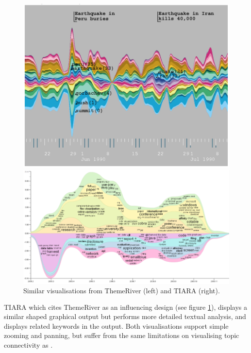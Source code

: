 \begin{figure}[h]
\centering
\begin{minipage}{.45\textwidth}
  \centering
  \hspace{-1cm}\includegraphics[width=.9\linewidth]{img/lit-survey/histogram1.png}
  \end{minipage}%
\begin{minipage}{.65\textwidth}
  \centering
  \hspace{-1.5cm}\includegraphics[width=.9\linewidth]{img/lit-survey/histogram2.png}
\end{minipage}
\caption{Similar visualisations from ThemeRiver \citep{ThemeRiver} (left) and TIARA \citep{InteractiveTopicBasedVisualTextSummarizationAndAnalysis} (right).}
  \label{fig:themeriver-tiara}

\end{figure}

TIARA \citep{InteractiveTopicBasedVisualTextSummarizationAndAnalysis} which cites ThemeRiver as an influencing design (see figure \ref{fig:themeriver-tiara}), displays a similar shaped graphical output but performs more detailed textual analysis, and displays related keywords in the output. Both visualisations support simple zooming and panning, but suffer from the same limitations on visualising topic connectivity as \citep{TimeSets}.

